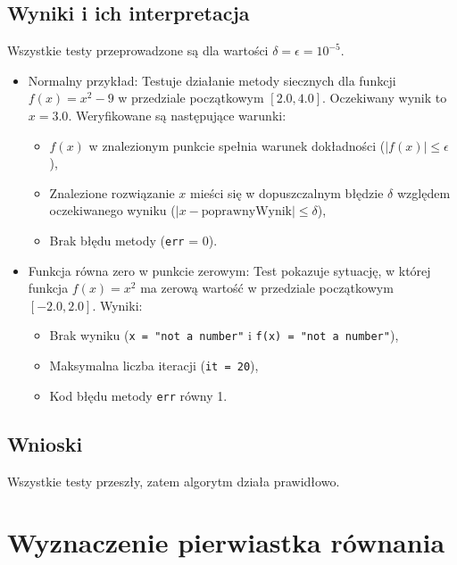 \documentclass{article}
\begin{document}
\subsection{Wyniki i ich interpretacja}
Wszystkie testy przeprowadzone są dla wartości $\delta = \epsilon = 10^{-5}$.
\begin{itemize}
    \item Normalny przykład:
    Testuje działanie metody siecznych dla funkcji \(f(x) = x^2 - 9\) w przedziale początkowym \([2.0, 4.0]\). Oczekiwany wynik to \(x = 3.0\). Weryfikowane są następujące warunki:
    \begin{itemize}
        \item \(f(x)\) w znalezionym punkcie spełnia warunek dokładności (\(|f(x)| \leq \epsilon\)),
        \item Znalezione rozwiązanie \(x\) mieści się w dopuszczalnym błędzie \(\delta\) względem oczekiwanego wyniku (\(|x - \text{poprawnyWynik}| \leq \delta\)),
        \item Brak błędu metody (\texttt{err} = 0).
    \end{itemize}
    
    \item Funkcja równa zero w punkcie zerowym:
    Test pokazuje sytuację, w której funkcja \(f(x) = x^2\) ma zerową wartość w przedziale początkowym \([-2.0, 2.0]\). Wyniki:
    \begin{itemize}
        \item Brak wyniku (\texttt{x = "not a number"} i \texttt{f(x) = "not a number"}),
        \item Maksymalna liczba iteracji (\texttt{it = 20}),
        \item Kod błędu metody \texttt{err} równy 1.
    \end{itemize}
\end{itemize}
\subsection{Wnioski}
Wszystkie testy przeszły, zatem algorytm działa prawidłowo.





\section{Wyznaczenie pierwiastka równania}
\end{document}
